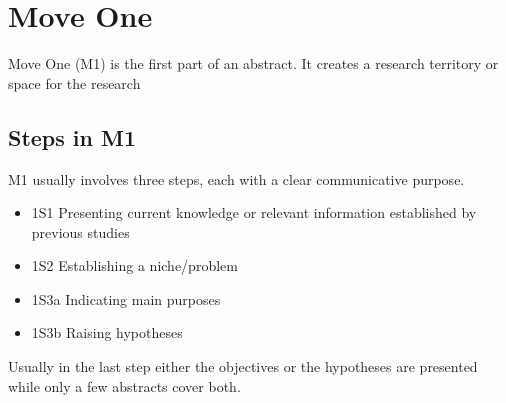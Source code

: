 \documentclass{ctexbook}
\begin{document}
\chapter{Move One}\label{chapter3}

Move One (M1) is the first part of an abstract. It creates a research territory or space for the research

\section{Steps in M1}

M1 usually involves three steps, each with a clear communicative purpose.

\begin{itemize}
  \item 1S1 Presenting current knowledge or relevant information established by previous studies

  \item 1S2 Establishing a niche/problem

  \item 1S3a Indicating main purposes

  \item 1S3b Raising hypotheses
\end{itemize}

Usually in the last step either the objectives or the hypotheses are presented while only a few abstracts cover both.
\end{document}
